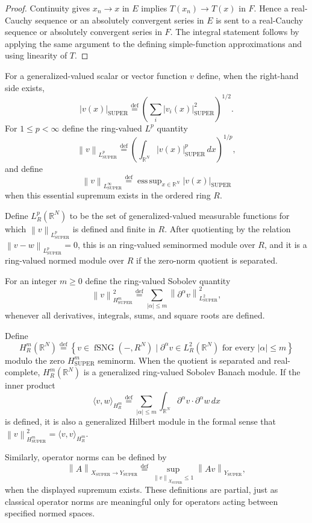 \documentclass{amsart}
\newcommand{\setcond}[2]{\left\{ #1 \mid #2 \right\}}
\DeclareMathOperator{\SUPER}{SUPER}
\DeclareMathOperator{\fSNG}{fSNG}
\DeclareMathOperator*{\esssup}{ess\,sup}
\newcommand{\eqdef}{\overset{\mathrm{def}}{=}}
\newcommand{\norm}[1]{\left\lVert #1\right\rVert}
\newcommand{\abs}[1]{\left\lvert #1\right\rvert}
\begin{document}
\begin{proof}
Continuity gives $x_n\to x$ in $E$ implies $T(x_n)\to T(x)$ in $F$.  Hence a
real-Cauchy sequence or an absolutely convergent series in $E$ is sent to a
real-Cauchy sequence or absolutely convergent series in $F$.  The integral
statement follows by applying the same argument to the defining simple-function
approximations and using linearity of $T$.
\end{proof}

For a generalized-valued scalar or vector function $v$ define, when the
right-hand side exists,
\[
  \abs{v(x)}_{\SUPER}
  \eqdef \left(\sum_i \abs{v_i(x)}_{\SUPER}^2\right)^{1/2}.
\]
For $1\leq p<\infty$ define the ring-valued $L^p$ quantity
\[
  \norm{v}_{L^p_{\SUPER}}
  \eqdef \left(\int_{\mathbb{R}^N}\abs{v(x)}_{\SUPER}^p\,dx\right)^{1/p},
\]
and define
\[
  \norm{v}_{L^\infty_{\SUPER}}
  \eqdef \esssup_{x\in\mathbb{R}^N}\abs{v(x)}_{\SUPER}
\]
when this essential supremum exists in the ordered ring
$R$.

Define $L^p_R(\mathbb{R}^N)$ to be the set of generalized-valued measurable
functions for which $\norm{v}_{L^p_{\SUPER}}$ is defined and finite in $R$.
After quotienting by the relation $\norm{v-w}_{L^p_{\SUPER}}=0$, this is an
ring-valued seminormed module over $R$, and it is a ring-valued normed module
over $R$ if the zero-norm quotient is separated.

For an integer $m\geq0$ define the ring-valued Sobolev quantity
\[
  \norm{v}_{H^m_{\SUPER}}^2
  \eqdef \sum_{\abs{\alpha}\leq m}
  \norm{\partial^\alpha v}_{L^2_{\SUPER}}^2,
\]
whenever all derivatives, integrals, sums, and square roots are defined.

Define
\[
  H^m_R(\mathbb{R}^N)
  \eqdef
  \setcond{v\in\fSNG({-},R^N)}
  {\partial^\alpha v\in L^2_R(\mathbb{R}^N)\text{ for every }\abs{\alpha}\leq m}
\]
modulo the zero $H^m_{\SUPER}$ seminorm.  When the quotient is separated and
real-complete, $H^m_R(\mathbb{R}^N)$ is a generalized ring-valued Sobolev
Banach module.  If the inner product
\[
  \langle v,w\rangle_{H^m_R}
  \eqdef
  \sum_{\abs{\alpha}\leq m}
  \int_{\mathbb{R}^N}\partial^\alpha v\cdot\partial^\alpha w\,dx
\]
is defined, it is also a generalized Hilbert module in the formal sense that
$\norm{v}_{H^m_{\SUPER}}^2=\langle v,v\rangle_{H^m_R}$.

Similarly, operator norms can be defined by
\[
  \norm{A}_{X_{\SUPER}\to Y_{\SUPER}}
  \eqdef
  \sup_{\norm{v}_{X_{\SUPER}}\leq 1}\norm{Av}_{Y_{\SUPER}},
\]
when the displayed supremum exists.  These definitions are partial, just as
classical operator norms are meaningful only for operators acting between
specified normed spaces.
\end{document}
